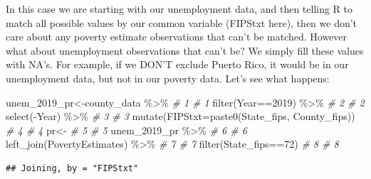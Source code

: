 \documentclass[
]{book}
\newenvironment{Shaded}{\begin{snugshade}}{\end{snugshade}}
\newcommand{\AttributeTok}[1]{\textcolor[rgb]{0.77,0.63,0.00}{#1}}
\newcommand{\CommentTok}[1]{\textcolor[rgb]{0.56,0.35,0.01}{\textit{#1}}}
\newcommand{\DecValTok}[1]{\textcolor[rgb]{0.00,0.00,0.81}{#1}}
\newcommand{\FunctionTok}[1]{\textcolor[rgb]{0.00,0.00,0.00}{#1}}
\newcommand{\NormalTok}[1]{#1}
\newcommand{\OtherTok}[1]{\textcolor[rgb]{0.56,0.35,0.01}{#1}}
\newcommand{\SpecialCharTok}[1]{\textcolor[rgb]{0.00,0.00,0.00}{#1}}
\begin{document}
In this case we are starting with our unemployment data, and then telling R to match all possible values by our common variable (FIPStxt here), then we don't care about any poverty estimate observations that can't be matched. However what about unemployment observations that can't be? We simply fill these values with NA's. For example, if we DON'T exclude Puerto Rico, it would be in our unemployment data, but not in our poverty data. Let's see what happens:

\begin{Shaded}
\begin{Highlighting}[]
\NormalTok{unem\_2019\_pr}\OtherTok{\textless{}{-}}\NormalTok{county\_data }\SpecialCharTok{\%\textgreater{}\%}                      \CommentTok{\# 1  \# 1}
  \FunctionTok{filter}\NormalTok{(Year}\SpecialCharTok{==}\DecValTok{2019}\NormalTok{) }\SpecialCharTok{\%\textgreater{}\%}                           \CommentTok{\# 2  \# 2}
  \FunctionTok{select}\NormalTok{(}\SpecialCharTok{{-}}\NormalTok{Year) }\SpecialCharTok{\%\textgreater{}\%}                                \CommentTok{\# 3  \# 3}
  \FunctionTok{mutate}\NormalTok{(}\AttributeTok{FIPStxt=}\FunctionTok{paste0}\NormalTok{(State\_fips, County\_fips))  }\CommentTok{\# 4  \# 4}
\NormalTok{pr}\OtherTok{\textless{}{-}}                                               \CommentTok{\# 5  \# 5}
\NormalTok{  unem\_2019\_pr }\SpecialCharTok{\%\textgreater{}\%}                                 \CommentTok{\# 6  \# 6}
  \FunctionTok{left\_join}\NormalTok{(PovertyEstimates) }\SpecialCharTok{\%\textgreater{}\%}                  \CommentTok{\# 7  \# 7}
  \FunctionTok{filter}\NormalTok{(State\_fips}\SpecialCharTok{==}\DecValTok{72}\NormalTok{)                           }\CommentTok{\# 8  \# 8}
\end{Highlighting}
\end{Shaded}

\begin{verbatim}
## Joining, by = "FIPStxt"
\end{verbatim}
\end{document}
